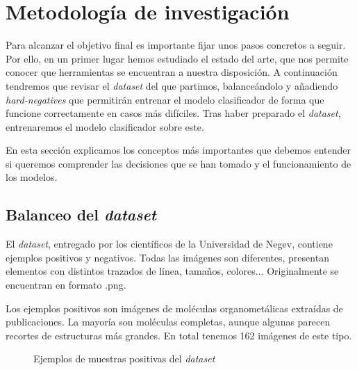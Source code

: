 \chapter{Metodología de investigación}
Para alcanzar el objetivo final es importante fijar unos pasos concretos a seguir. Por ello, en un primer lugar hemos estudiado el estado del arte, que nos permite conocer que herramientas se encuentran a nuestra disposición. A continuación tendremos que revisar el \textit{dataset} del que partimos, balanceándolo y añadiendo \textit{hard-negatives} que permitirán entrenar el modelo clasificador de forma que funcione correctamente en casos más difíciles. Tras haber preparado el \textit{dataset}, entrenaremos el modelo clasificador sobre este.

En esta sección explicamos los conceptos más importantes que debemos entender si queremos comprender las decisiones que se han tomado y el funcionamiento de los modelos.

\newpage
\section{Balanceo del \textit{dataset}}
El \textit{dataset}, entregado por los científicos de la Universidad de Negev, contiene ejemplos positivos y negativos. Todas las imágenes son diferentes, presentan elementos con distintos trazados de línea, tamaños, colores... Originalmente se encuentran en formato .png.

Los ejemplos positivos son imágenes de moléculas organometálicas extraídas de publicaciones. La mayoría son moléculas completas, aunque algunas parecen recortes de estructuras más grandes. En total tenemos 162 imágenes de este tipo.

\begin{figure}[H]
\centering
    \caption{Ejemplos de muestras positivas del \textit{dataset}} 
\end{figure}

